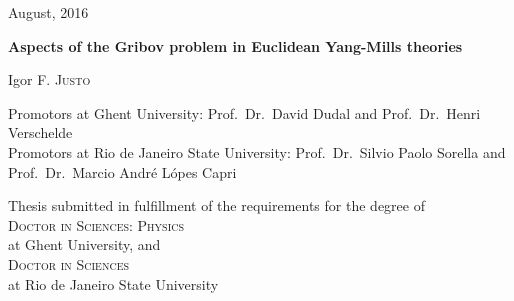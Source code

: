 \begin{titlepage}
\begin{center}


\vspace{1cm}

August, 2016 \\

\vspace*{2cm}

{\Huge\bf Aspects of the Gribov problem in Euclidean Yang-Mills theories} \\

\vspace*{1cm}

{\LARGE Igor F. \textsc{Justo}} %

\vspace*{2cm}

Promotors at Ghent University: Prof.\ Dr.\ David Dudal and Prof.\ Dr.\ Henri Verschelde \\ 
Promotors at Rio de Janeiro State University: Prof.\ Dr.\ Silvio Paolo Sorella and \\ Prof.\ Dr.\ Marcio Andr\'e L\'opes Capri

\vspace*{2cm}

Thesis submitted in fulfillment of the requirements for the degree of  \\ 
\textsc{Doctor in Sciences: Physics} \\ 
at Ghent University, and  \\
\textsc{Doctor in Sciences} \\ 
at Rio de Janeiro State University

\end{center}

\end{titlepage}












